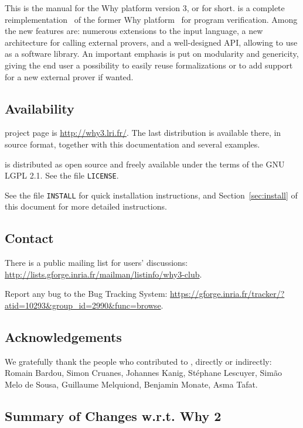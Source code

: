 \documentclass[a4paper,11pt,twoside,openright]{memoir}
\begin{document}
This is the manual for the Why platform version 3, or \why for
short. \why is a complete reimplementation~\cite{boogie11why3} of the former Why
platform~\cite{filliatre07cav} for program
verification. Among the new features are: numerous
extensions to the input language, a new architecture for calling
external provers, and a well-designed API, allowing to use \why as a
software library.  An important emphasis is put on modularity and
genericity, giving the end user a possibility to easily reuse \why
formalizations or to add support for a new external prover if wanted.

\subsection*{Availability}

\why project page is \url{http://why3.lri.fr/}.  The last distribution
is available there, in source format, together with this documentation
and several examples.

\why is distributed as open source and freely available under the
terms of the GNU LGPL 2.1. See the file \texttt{LICENSE}.

See the file \texttt{INSTALL} for quick installation instructions, and
Section~\ref{sec:install} of this document for more detailed
instructions.

\subsection*{Contact}

There is a public mailing list for users' discussions:
\url{http://lists.gforge.inria.fr/mailman/listinfo/why3-club}.

Report any bug to the \why Bug Tracking System:
\url{https://gforge.inria.fr/tracker/?atid=10293&group_id=2990&func=browse}.


\subsection*{Acknowledgements}

We gratefully thank the people who contributed to \why, directly or
indirectly: Romain Bardou, Simon Cruanes, Johannes Kanig, St\'ephane
Lescuyer, Sim\~ao Melo de Sousa, Guillaume Melquiond, Benjamin Monate,
Asma Tafat.

\subsection*{Summary of Changes w.r.t. Why 2}
\end{document}
